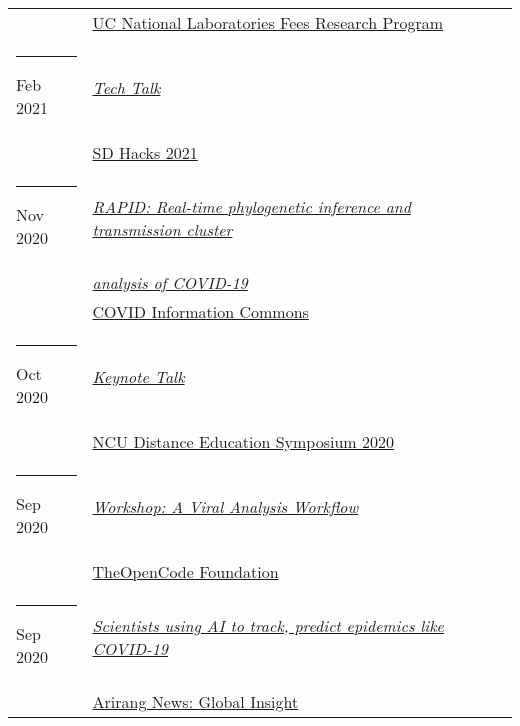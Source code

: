 \documentclass[margin,line]{res}
\begin{document}
\begin{resume}
\begin{longtable}{@{}p{0.7in}p{4in}}
\hspace*{-4mm} & \hspace{4mm} \href{https://www.ucop.edu/research-initiatives/programs/lab-fees/index.html}{UC National Laboratories Fees Research Program}\\
\hspace*{-4mm} \rule{-1mm}{5mm} Feb 2021 & \href{https://www.sdhacks.io/}{\textit{Tech Talk}}\\*
\hspace*{-4mm} & \hspace{4mm} \href{https://www.sdhacks.io/}{SD Hacks 2021}\\
\hspace*{-4mm} \rule{-1mm}{5mm} Nov 2020 & \href{https://www.youtube.com/watch?v=6-fDbTY8ySI}{\textit{RAPID: Real-time phylogenetic inference and transmission cluster}}\\*
\hspace*{-4mm} & \hspace{4mm} \href{https://www.youtube.com/watch?v=6-fDbTY8ySI}{\textit{analysis of COVID-19}}\\*
\hspace*{-4mm} & \hspace{4mm} \href{https://covidinfocommons.datascience.columbia.edu/}{COVID Information Commons}\\
\hspace*{-4mm} \rule{-1mm}{5mm} Oct 2020 & \href{http://distance.ncu.edu.jm/proposal_submission}{\textit{Keynote Talk}}\\*
\hspace*{-4mm} & \hspace{4mm} \href{http://distance.ncu.edu.jm/proposal_submission}{NCU Distance Education Symposium 2020}\\
\hspace*{-4mm} \rule{-1mm}{5mm} Sep 2020 & \href{https://www.theopencode.org/a-viral-analysis-workflow/}{\textit{Workshop: A Viral Analysis Workflow}}\\*
\hspace*{-4mm} & \hspace{4mm} \href{https://www.theopencode.org/}{TheOpenCode Foundation}\\
\hspace*{-4mm} \rule{-1mm}{5mm} Sep 2020 & \href{https://youtu.be/xHSFWtLL8bc}{\textit{Scientists using AI to track, predict epidemics like COVID-19}}\\*
\hspace*{-4mm} & \hspace{4mm} \href{https://www.arirang.com/}{Arirang News: Global Insight}\\

\end{longtable}
\end{resume}
\end{document}
